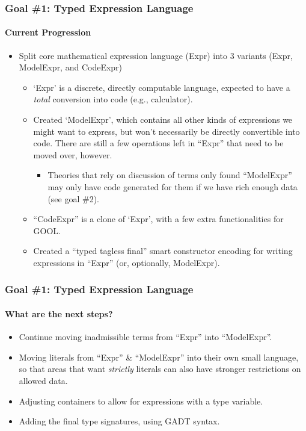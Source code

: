 \documentclass{beamer}
\begin{document}
\begin{frame}
    \frametitle{Goal \#1: Typed Expression Language}
    \framesubtitle{Current Progression}
    
    \begin{itemize}
        \item<2-> Split core mathematical expression language (Expr) into 3 variants (Expr, ModelExpr, and CodeExpr)
            \begin{itemize}
                \item<3-> `Expr' is a discrete, directly computable language, expected to have a \emph{total} conversion into code (e.g., calculator).
                \item<4-> Created `ModelExpr', which contains all other kinds of expressions we might want to express, but won't necessarily be directly convertible into code. There are still a few operations left in ``Expr'' that need to be moved over, however.
                    \begin{itemize}
                        \item<5-> Theories that rely on discussion of terms only found ``ModelExpr'' may only have code generated for them if we have rich enough data (see goal \#2).
                    \end{itemize}
                \item<6-> ``CodeExpr'' is a clone of `Expr', with a few extra functionalities for GOOL.
                \item<7-> Created a ``typed tagless final'' smart constructor encoding for writing expressions in ``Expr'' (or, optionally, ModelExpr).
            \end{itemize}
    \end{itemize}
\end{frame}

\begin{frame}
    \frametitle{Goal \#1: Typed Expression Language}
    \framesubtitle{What are the next steps?}
    
    \begin{itemize}
        \item<2-> Continue moving inadmissible terms from ``Expr'' into ``ModelExpr''.
        \item<3-> Moving literals from ``Expr'' \& ``ModelExpr'' into their own small language, so that areas that want \emph{strictly} literals can also have stronger restrictions on allowed data.
        \item<4-> Adjusting containers to allow for expressions with a type variable.
        \item<5-> Adding the final type signatures, using GADT syntax.
    \end{itemize}
\end{frame}
\end{document}
